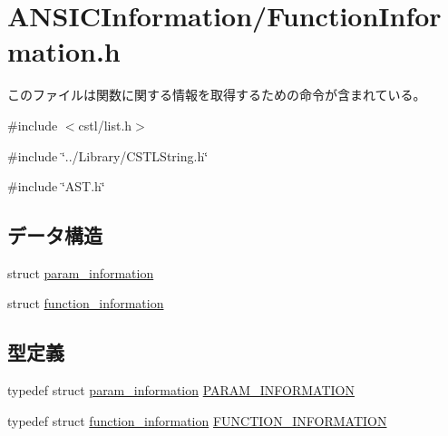 \section{ANSICInformation/FunctionInformation.h}
\label{FunctionInformation_8h}


このファイルは関数に関する情報を取得するための命令が含まれている。  


{\ttfamily \#include $<$cstl/list.h$>$}\par
{\ttfamily \#include \char`\"{}../Library/CSTLString.h\char`\"{}}\par
{\ttfamily \#include \char`\"{}AST.h\char`\"{}}\par
\subsection*{データ構造}
\begin{DoxyCompactItemize}
\item 
struct \hyperlink{structparam__information}{param\_\-information}
\item 
struct \hyperlink{structfunction__information}{function\_\-information}
\end{DoxyCompactItemize}
\subsection*{型定義}
\begin{DoxyCompactItemize}
\item 
typedef struct \hyperlink{structparam__information}{param\_\-information} \hyperlink{FunctionInformation_8h_ae4491ef8fff9eec21ce52d12bc035b04}{PARAM\_\-INFORMATION}
\item 
typedef struct \hyperlink{structfunction__information}{function\_\-information} \hyperlink{FunctionInformation_8h_aab4e23ad10f5b3c5e209289dbb41df40}{FUNCTION\_\-INFORMATION}
\end{DoxyCompactItemize}

